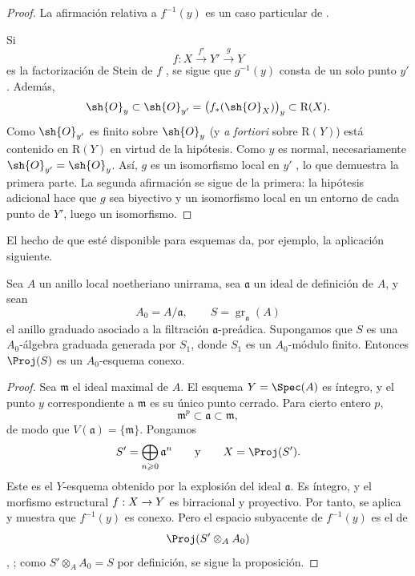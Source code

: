 \documentclass[oneside]{amsart}
\makeatletter
\renewcommand{\geq}{\geqslant}
\newcommand{\ega@arrow}[2]{\mathchoice{#1}{#2}{#2}{#2}}
\renewcommand{\to}{\ega@arrow{\longrightarrow}{\rightarrow}}
\newcommand{\oldpage}[2][]{{\marginnote{\normalfont\textbf{#1}~|~#2}}\ignorespaces}
\let\EGAOriginalLabel\label
\renewcommand{\label}[1]{\phantomsection\EGAOriginalLabel{#1}}
\makeatother
\begin{document}
\begin{proof}
La afirmación relativa a $f^{-1}(y)$ es un caso particular de
.

\oldpage[III]{135}

Si
\[
  f:X\xrightarrow{f'}Y'\xrightarrow{g}Y
\]
es la factorización de Stein de $f$ , se sigue que
$g^{-1}(y)$ consta de un solo punto $y'$. Además,
\[
  \sh{O}_y
  \subset
  \sh{O}_{y'}
  =
  \bigl(f_*(\sh{O}_X)\bigr)_y
  \subset
  \mathrm{R}(X).
\]
Como $\sh{O}_{y'}$ es finito sobre $\sh{O}_y$ (y \emph{a fortiori} sobre $\mathrm{R}(Y)$) está contenido en $\mathrm{R}(Y)$ en virtud de la hipótesis. Como $y$ es normal, necesariamente
$\sh{O}_{y'}=\sh{O}_y$. Así, $g$ es un isomorfismo local en $y'$
, lo que demuestra la primera parte. La segunda
afirmación se sigue de la primera: la hipótesis adicional hace que $g$
sea biyectivo y un isomorfismo local en un entorno de cada punto de
$Y'$, luego un isomorfismo.
\end{proof}

El hecho de que  esté disponible para esquemas da, por
ejemplo, la aplicación siguiente.

\begin{proposition}[4.3.13]
\label{III.4.3.13}
Sea $A$ un anillo local noetheriano unirrama, sea $\mathfrak{a}$ un
ideal de definición de $A$, y sean
\[
  A_0=A/\mathfrak{a},
  \qquad
  S=\operatorname{gr}_{\mathfrak{a}}(A)
\]
el anillo graduado asociado a la filtración $\mathfrak{a}$-preádica.
Supongamos que $S$ es una $A_0$-álgebra graduada generada por $S_1$,
donde $S_1$ es un $A_0$-módulo finito. Entonces $\Proj(S)$ es un
$A_0$-esquema conexo.
\end{proposition}

\begin{proof}
Sea $\mathfrak{m}$ el ideal maximal de $A$. El esquema
$Y=\Spec(A)$ es íntegro, y el punto $y$ correspondiente a
$\mathfrak{m}$ es su único punto cerrado. Para cierto entero $p$,
\[
  \mathfrak{m}^p\subset\mathfrak{a}\subset\mathfrak{m},
\]
de modo que $V(\mathfrak{a})=\{\mathfrak{m}\}$. Pongamos
\[
  S'=\bigoplus_{n\geq0}\mathfrak{a}^n
  \qquad\text{y}\qquad
  X=\Proj(S').
\]
Este es el $Y$-esquema obtenido por la explosión del ideal
$\mathfrak{a}$. Es íntegro, y el morfismo estructural
$f:X\to Y$ es birracional  y proyectivo.
Por tanto,  se aplica y muestra que $f^{-1}(y)$ es
conexo. Pero el espacio subyacente de $f^{-1}(y)$ es el de
\[
  \Proj(S'\otimes_A A_0)
\]
, ; como
$S'\otimes_AA_0=S$ por definición, se sigue la proposición.
\end{proof}
\end{document}
